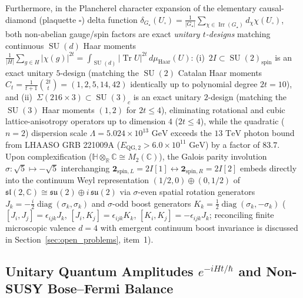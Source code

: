 \documentclass[11pt,a4paper]{article}
\theoremstyle{definition}
\theoremstyle{remark}
\newcommand{\R}{\mathbb{R}}
\newcommand{\C}{\mathbb{C}}
\newcommand{\quat}{\mathbb{H}}
\newcommand{\Tr}{\operatorname{Tr}}
\newcommand{\Irr}{\operatorname{Irr}}
\newcommand{\SU}{\operatorname{SU}}
\newcommand{\Gstar}{G_\star}
\begin{document}
Furthermore, in the Plancherel character expansion of the elementary causal-diamond (plaquette $\square$) delta function $\delta_{\Gstar}(U_\square) = \frac{1}{|\Gstar|}\sum_{\chi \in \Irr(\Gstar)} d_\chi \chi(U_\square)$, both non-abelian gauge/spin factors are exact \emph{unitary $t$-designs} matching continuous $\operatorname{SU}(d)$ Haar moments $\frac{1}{|H|}\sum_{g \in H} |\chi(g)|^{2t} = \int_{\operatorname{SU}(d)} |\Tr U|^{2t}\,d\mu_{\mathrm{Haar}}(U)$: (i)~$2I \subset \SU(2)_{\mathrm{spin}}$ is an exact unitary $5$-design (matching the $\SU(2)$ Catalan Haar moments $C_t = \frac{1}{t+1}\binom{2t}{t} = (1, 2, 5, 14, 42)$ identically up to polynomial degree $2t = 10$), and (ii)~$\Sigma(216 \times 3) \subset \SU(3)_c$ is an exact unitary $2$-design (matching the $\SU(3)$ Haar moments $(1, 2)$ for $2t \le 4$), eliminating rotational and cubic lattice-anisotropy operators up to dimension $4$ ($2t \le 4$), while the quadratic ($n = 2$) dispersion scale $\Lambda = 5.024 \times 10^{13}\text{ GeV}$ exceeds the $13\text{ TeV}$ photon bound from LHAASO GRB 221009A ($E_{\mathrm{QG},2} > 6.0 \times 10^{11}\text{ GeV}$) by a factor of $83.7$. Upon complexification ($\quat \otimes_\R \C \cong M_2(\C)$), the Galois parity involution $\sigma : \sqrt{5} \mapsto -\sqrt{5}$ interchanging $\mathbf{2}_{\mathrm{spin},L} = 2I[1] \leftrightarrow \mathbf{2}_{\mathrm{spin},R} = 2I[2]$ embeds directly into the continuum Weyl representation $(1/2,0) \oplus (0,1/2)$ of $\mathfrak{sl}(2,\C) \cong \mathfrak{su}(2) \oplus i\,\mathfrak{su}(2)$ via $\sigma$-even spatial rotation generators $J_k = -\frac{i}{2}\operatorname{diag}(\sigma_k, \sigma_k)$ and $\sigma$-odd boost generators $K_k = \frac{1}{2}\operatorname{diag}(\sigma_k, -\sigma_k)$ ($[J_i, J_j] = \epsilon_{ijk}J_k$, $[J_i, K_j] = \epsilon_{ijk}K_k$, $[K_i, K_j] = -\epsilon_{ijk}J_k$; reconciling finite microscopic valence $d = 4$ with emergent continuum boost invariance is discussed in Section~\ref{sec:open_problems}, item~1).

\subsection{Unitary Quantum Amplitudes $e^{-iHt/\hbar}$ and Non-SUSY Bose--Fermi Balance}
\end{document}
